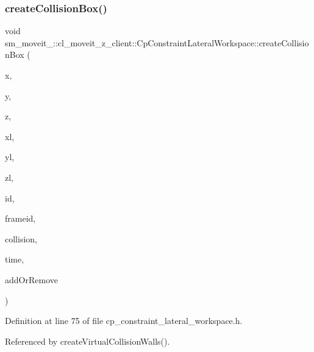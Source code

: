 \subsubsection{\texorpdfstring{create\+Collision\+Box()}{createCollisionBox()}}
{\footnotesize\ttfamily void sm\+\_\+moveit\+\_\+::cl\+\_\+moveit\+\_\+z\+\_\+client\+::\+Cp\+Constraint\+Lateral\+Workspace\+::create\+Collision\+Box (\begin{DoxyParamCaption}\item[{float}]{x,  }\item[{float}]{y,  }\item[{float}]{z,  }\item[{float}]{xl,  }\item[{float}]{yl,  }\item[{float}]{zl,  }\item[{std\+::string}]{id,  }\item[{std\+::string}]{frameid,  }\item[{moveit\+\_\+msgs\+::\+Collision\+Object \&}]{collision,  }\item[{const ros\+::\+Time \&}]{time,  }\item[{int}]{add\+Or\+Remove }\end{DoxyParamCaption})\hspace{0.3cm}{\ttfamily [inline]}}



Definition at line 75 of file cp\+\_\+constraint\+\_\+lateral\+\_\+workspace.\+h.



Referenced by create\+Virtual\+Collision\+Walls().


